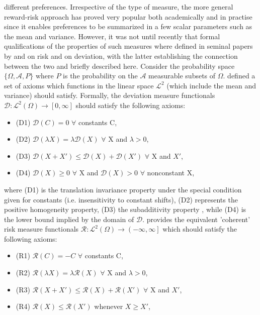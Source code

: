 different preferences. Irrespective of the type of measure, the more general
reward-risk approach has proved very popular both academically and in
practise since it enables preferences to be summarized in a few scalar
parameters such as the mean and variance. However, it was not until recently
that formal qualifications of the properties of such measures where defined
in seminal papers by  and  on
risk and  on deviation, with the latter
establishing the connection between the two and briefly described here.
Consider the probability space $\{\Omega, \mathcal{A}, P\}$ where $P$ is the
probability on the $\mathcal{A}$ measurable subsets of $\Omega$.
 defined a set of axioms which functions in the
linear space $\mathcal{L}^2$ (which include the mean and variance) should
satisfy. Formally, the deviation measure functionals
$\mathcal{D}:{\mathcal{L}^2}(\Omega) \to \left[ {0,\infty } \right]$ should
satisfy the following axioms:
\begin{itemize}
\item (D1) $\mathcal{D}\left(C\right)=0$ $\forall$ constants C,
\item (D2) $\mathcal{D}\left(\lambda X\right)=\lambda\mathcal{D}\left(X\right)$ $\forall$ X and $\lambda>0$,
\item (D3) $\mathcal{D}\left(X+X'\right)\leq \mathcal{D}\left(X\right)+\mathcal{D}\left(X'\right)$ $\forall$ X and $X'$,
\item (D4) $\mathcal{D}\left(X\right)\geq 0$ $\forall$ X and $\mathcal{D}\left(X\right)>0$ $\forall$ nonconstant X,
\end{itemize}
where (D1) is the translation invariance property under the special condition
given  for constants (i.e. insensitivity to constant shifts), (D2) represents
the positive homogeneity property, (D3) the subadditivity property , while
(D4) is the lower bound implied by the domain of $\mathcal{D}$.
 provides the equivalent 'coherent' risk measure
functionals $\mathcal{R}:{\mathcal{L}^2}(\Omega) \to \left( {-\infty,\infty }
\right]$ which should satisfy the following axioms:
\begin{itemize}
\item (R1) $\mathcal{R}\left(C\right)=-C$ $\forall$ constants C,
\item (R2) $\mathcal{R}\left(\lambda X\right)=\lambda\mathcal{R}\left(X\right)$ $\forall$ X and $\lambda>0$,
\item (R3) $\mathcal{R}\left(X+X'\right)\leq \mathcal{R}\left(X\right)+\mathcal{R}\left(X'\right)$ $\forall$ X and $X'$,
\item (R4) $\mathcal{R}\left(X\right)\leq \mathcal{R}\left(X'\right)$ whenever $X\geq X'$,
\end{itemize}
